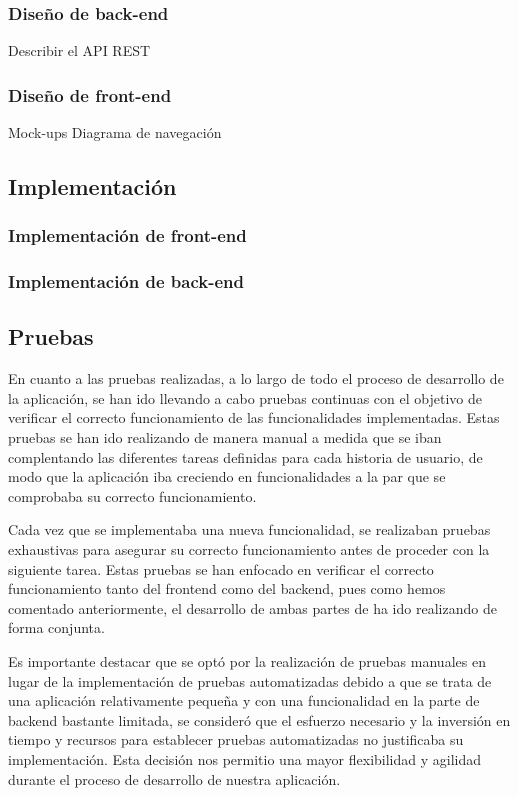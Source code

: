 \documentclass[12pt]{article}
\begin{document}
\subsubsection{Diseño de back-end}
Describir el API REST
\subsubsection{Diseño de front-end}
Mock-ups
Diagrama de navegación

\subsection{Implementación}

\subsubsection{Implementación de front-end}
\subsubsection{Implementación de back-end}

\subsection{Pruebas}
En cuanto a las pruebas realizadas, a lo largo de todo el proceso de desarrollo de la aplicación, se han ido llevando a cabo pruebas continuas
con el objetivo de verificar el correcto funcionamiento de las funcionalidades implementadas. Estas pruebas se han ido realizando de manera manual 
a medida que se iban complentando las diferentes tareas definidas para cada historia de usuario, de modo que la aplicación iba creciendo en funcionalidades 
a la par que se comprobaba su correcto funcionamiento.

Cada vez que se implementaba una nueva funcionalidad, se realizaban pruebas exhaustivas para asegurar su correcto funcionamiento antes de proceder con la 
siguiente tarea. Estas pruebas se han enfocado en verificar el correcto funcionamiento tanto del frontend como del backend, pues como hemos comentado anteriormente, 
el desarrollo de ambas partes de ha ido realizando de forma conjunta.

Es importante destacar que se optó por la realización de pruebas manuales en lugar de la implementación de pruebas automatizadas debido a que se 
trata de una aplicación relativamente pequeña y con una funcionalidad en la parte de backend bastante limitada, se consideró que el esfuerzo necesario y la inversión
en tiempo y recursos para establecer pruebas automatizadas no justificaba su implementación. Esta decisión nos permitio una mayor flexibilidad y agilidad durante
el proceso de desarrollo de nuestra aplicación.
\end{document}
